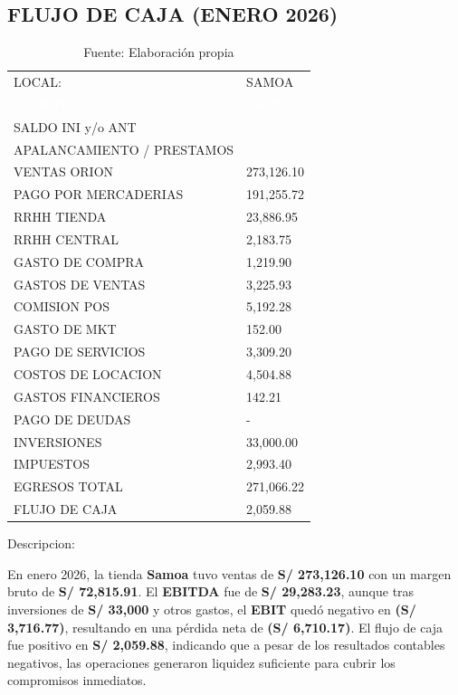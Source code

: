 \subsection*{FLUJO DE CAJA (ENERO 2026)}

\begin{table}[H]
	\centering
	\begin{tabular}{|L{8cm}|R{4cm}|}
	\hline
	 LOCAL: &  SAMOA \\
	\textcolor{white}{PERIODO:} & \textcolor{white}{Ene-26} \\ \hline
	SALDO INI y/o ANT & \\ 
	APALANCAMIENTO / PRESTAMOS & \\ 
	 VENTAS ORION & 273,126.10 \\ 
	PAGO POR MERCADERIAS & 191,255.72 \\ 
	RRHH TIENDA & 23,886.95 \\ 
	RRHH CENTRAL & 2,183.75 \\ 
	GASTO DE COMPRA & 1,219.90 \\ 
	GASTOS DE VENTAS & 3,225.93 \\ 
	COMISION POS & 5,192.28 \\ 
	GASTO DE MKT & 152.00 \\ 
	PAGO DE SERVICIOS & 3,309.20 \\ 
	COSTOS DE LOCACION & 4,504.88 \\ 
	GASTOS FINANCIEROS & 142.21 \\ 
	PAGO DE DEUDAS & - \\ 
	INVERSIONES & 33,000.00 \\ 
	IMPUESTOS & 2,993.40 \\ 
	 EGRESOS TOTAL & 271,066.22 \\ 
	 FLUJO DE CAJA & 2,059.88 \\ \hline
	\end{tabular}
\caption{Fuente: Elaboración propia}
\end{table}

Descripcion:

En enero 2026, la tienda \textbf{Samoa} tuvo ventas de \textbf{S/ 273,126.10} con un margen bruto de \textbf{S/ 72,815.91}. El \textbf{EBITDA} fue de \textbf{S/ 29,283.23}, aunque tras inversiones de \textbf{S/ 33,000} y otros gastos, el \textbf{EBIT} quedó negativo en \textbf{(S/ 3,716.77)}, resultando en una pérdida neta de \textbf{(S/ 6,710.17)}. El flujo de caja fue positivo en \textbf{S/ 2,059.88}, indicando que a pesar de los resultados contables negativos, las operaciones generaron liquidez suficiente para cubrir los compromisos inmediatos.

